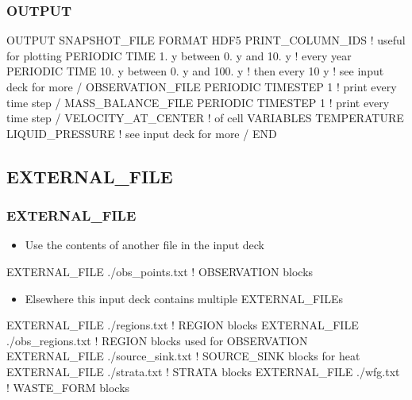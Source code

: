 \documentclass{beamer}
\newcommand\bluecomment[1]{{{\color{blue} #1}}}
\begin{document}
\begin{frame}[fragile]\frametitle{OUTPUT}

\begin{semiverbatim}\small
OUTPUT
  SNAPSHOT_FILE
    FORMAT HDF5
    PRINT_COLUMN_IDS \bluecomment{! useful for plotting}
    PERIODIC TIME 1. y between 0. y and 10. y  \bluecomment{! every year}
    PERIODIC TIME 10. y between 0. y and 100. y  \bluecomment{! then every 10 y}
    \bluecomment{! see input deck for more}
  /
  OBSERVATION_FILE
    PERIODIC TIMESTEP 1 \bluecomment{! print every time step}
  /
  MASS_BALANCE_FILE
    PERIODIC TIMESTEP 1 \bluecomment{! print every time step}
  /
  VELOCITY_AT_CENTER \bluecomment{! of cell}
  VARIABLES
    TEMPERATURE
    LIQUID_PRESSURE \bluecomment{! see input deck for more}
  /
END
\end{semiverbatim}

\end{frame}

\subsection{EXTERNAL\_FILE}

\begin{frame}[fragile]\frametitle{EXTERNAL\_FILE}
\begin{itemize}
  \item Use the contents of another file in the input deck
\end{itemize}

\begin{semiverbatim}
EXTERNAL_FILE ./obs_points.txt \bluecomment{! OBSERVATION blocks}
\end{semiverbatim}

\begin{itemize}
  \item Elsewhere this input deck contains multiple EXTERNAL\_FILEs
\end{itemize}

\begin{semiverbatim}
EXTERNAL_FILE ./regions.txt \bluecomment{! REGION blocks}
EXTERNAL_FILE ./obs_regions.txt \bluecomment{! REGION blocks used for OBSERVATION} 
EXTERNAL_FILE ./source_sink.txt \bluecomment{! SOURCE_SINK blocks for heat}
EXTERNAL_FILE ./strata.txt \bluecomment{! STRATA blocks}
EXTERNAL_FILE ./wfg.txt \bluecomment{! WASTE_FORM blocks}
\end{semiverbatim}

\end{frame}
\end{document}
